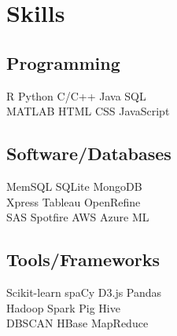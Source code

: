 \documentclass[]{deedy-resume-openfont}
\begin{document}
\begin{minipage}[t]{0.31\textwidth}

\section{Skills}
\subsection{Programming}
\textbullet{} R \textbullet{} Python \textbullet{} C/C++ \textbullet{} Java \textbullet{} SQL \\
\textbullet{} MATLAB \textbullet{} HTML \textbullet{} CSS \textbullet{} JavaScript 
\sectionsep

\subsection{Software/Databases}
\textbullet{} MemSQL \textbullet{} SQLite \textbullet{} MongoDB  \\
\textbullet{} Xpress \textbullet{} Tableau \textbullet{} OpenRefine \\
\textbullet{} SAS \textbullet{} Spotfire \textbullet{} AWS \textbullet{} Azure ML
\sectionsep

\subsection{Tools/Frameworks}
\textbullet{} Scikit-learn \textbullet{} spaCy \textbullet{} D3.js \textbullet{} Pandas \\
\textbullet{} Hadoop \textbullet{} Spark \textbullet{} Pig \textbullet{} Hive \\ 
\textbullet{} DBSCAN \textbullet{} HBase \textbullet{} MapReduce
\sectionsep

%
%

\end{minipage} 
\hfill
\end{document}
